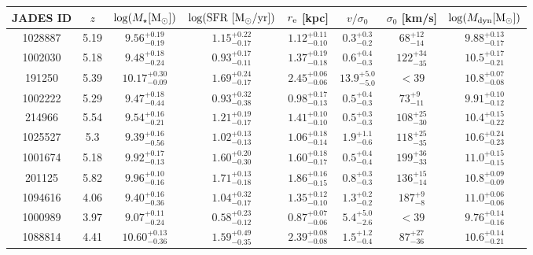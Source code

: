 \begin{table}
    \centering
    \begin{tabular}{c|c|c|c|c|c|c|c}
         JADES ID & $z$ & $\log (M_{\star} \rm [M_{\odot}])$ & $\rm \log (SFR ~ [M_{\odot}/yr])$  & $r_{\rm e}$ [kpc] &  $v/\sigma_0$ & $\sigma_0$ [km/s] & $\log (M_{\rm dyn} \rm [M_{\odot}])$\\ \hline
1028887 &     5.19 & $9.56^{+0.19}_{-0.19}$  & $1.15^{+0.22}_{-0.17}$ & $1.12^{+0.11}_{-0.10}$ & $0.3^{+0.3}_{-0.2}$ & $68^{+12}_{-14}$  & $9.88^{+0.13}_{-0.17}$ \\
 1002030 &     5.18 & $9.48^{+0.18}_{-0.24}$  & $0.93^{+0.17}_{-0.11}$ & $1.37^{+0.19}_{-0.18}$ & $0.6^{+0.4}_{-0.3}$ & $122^{+34}_{-35}$ & $10.5^{+0.17}_{-0.21}$ \\
  191250 &     5.39 & $10.17^{+0.30}_{-0.09}$ & $1.69^{+0.24}_{-0.17}$ & $2.45^{+0.06}_{-0.06}$ & $13.9^{+5.0}_{-5.0}$ & $<39$  & $10.8^{+0.07}_{-0.08}$ \\
 1002222 &     5.29 & $9.47^{+0.18}_{-0.44}$  & $0.93^{+0.32}_{-0.38}$ & $0.98^{+0.17}_{-0.13}$ & $0.5^{+0.4}_{-0.3}$ & $73^{+9}_{-11}$   & $9.91^{+0.10}_{-0.12}$ \\
  214966 &     5.54 & $9.54^{+0.16}_{-0.21}$  & $1.21^{+0.19}_{-0.17}$ & $1.41^{+0.10}_{-0.10}$ & $0.5^{+0.3}_{-0.3}$  & $108^{+25}_{-30}$ & $10.4^{+0.15}_{-0.22}$ \\
 1025527 &     5.3  & $9.39^{+0.16}_{-0.56}$  & $1.02^{+0.13}_{-0.13}$ & $1.06^{+0.18}_{-0.14}$ & $1.9^{+1.1}_{-0.6}$ & $118^{+25}_{-35}$ & $10.6^{+0.24}_{-0.23}$ \\
 1001674 &     5.18 & $9.92^{+0.17}_{-0.13}$  & $1.60^{+0.20}_{-0.30}$ & $1.60^{+0.18}_{-0.17}$ & $0.5^{+0.4}_{-0.4}$ & $199^{+36}_{-33}$ & $11.0^{+0.15}_{-0.15}$ \\
  201125 &     5.82 & $9.96^{+0.10}_{-0.16}$  & $1.71^{+0.13}_{-0.18}$ & $1.86^{+0.16}_{-0.15}$ & $0.8^{+0.3}_{-0.3}$ & $136^{+15}_{-14}$ & $10.8^{+0.09}_{-0.09}$ \\
 1094616 &     4.06 & $9.40^{+0.16}_{-0.36}$  & $1.04^{+0.32}_{-0.17}$ & $1.35^{+0.12}_{-0.10}$ & $1.3^{+0.2}_{-0.2}$  & $187^{+9}_{-8}$   & $11.0^{+0.06}_{-0.06}$ \\
 1000989 &     3.97 & $9.07^{+0.11}_{-0.24}$  & $0.58^{+0.23}_{-0.12}$ & $0.87^{+0.07}_{-0.06}$ & $5.4^{+5.0}_{-2.6}$  & $<39$  & $9.76^{+0.14}_{-0.16}$ \\
 1088814 &   4.41 & $10.60^{+0.13}_{-0.36}$ & $1.59^{+0.49}_{-0.35}$ & $2.39^{+0.08}_{-0.08}$ & $1.5^{+1.2}_{-0.4}$  & $87^{+27}_{-36}$  & $10.6^{+0.14}_{-0.21}$ \\

\end{tabular}
\end{table}
